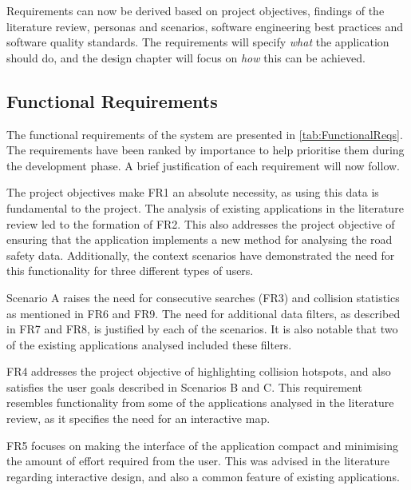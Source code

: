 \documentclass[authoryearcitations]{UoYCSproject}
\begin{document}
Requirements can now be derived based on project objectives, findings of the literature review, personas and scenarios, software engineering best practices and software quality standards. The requirements will specify \textit{what} the application should do, and the design chapter will focus on \textit{how} this can be achieved.

\subsection{Functional Requirements}
\label{sect:functReqs}

The functional requirements of the system are presented in \autoref{tab:FunctionalReqs}. The requirements have been ranked by importance to help prioritise them during the development phase. A brief justification of each requirement will now follow. 

The project objectives make FR1 an absolute necessity, as using this data is fundamental to the project. The analysis of existing applications in the literature review led to the formation of FR2. This also addresses the project objective of ensuring that the application implements a new method for analysing the road safety data. Additionally, the context scenarios have demonstrated the need for this functionality for three different types of users. 

Scenario A raises the need for consecutive searches (FR3) and collision statistics as mentioned in FR6 and FR9. The need for additional data filters, as described in FR7 and FR8, is justified by each of the scenarios. It is also notable that two of the existing applications analysed included these filters. 

FR4 addresses the project objective of highlighting collision hotspots, and also satisfies the user goals described in Scenarios B and C. This requirement resembles functionality from some of the applications analysed in the literature review, as it specifies the need for an interactive map.

FR5 focuses on making the interface of the application compact and minimising the amount of effort required from the user. This was advised in the literature regarding interactive design, and also a common feature of existing applications.
\end{document}
